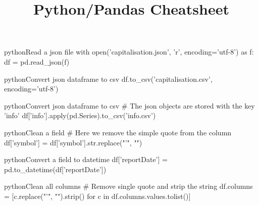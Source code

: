 \documentclass[10pt,a4paper]{article}
\title{\color{w3schools}Python/Pandas Cheatsheet
}
\begin{document}
\maketitle
\small
\begin{multicols}{3}

\thispagestyle{empty}
\scriptsize

% 




\begin{codebox}{python}{Read a json file}
with open('capitalisation.json', 'r', encoding='utf-8') as f:
     df = pd.read_json(f)

\end{codebox}

\begin{codebox}{python}{Convert json dataframe to csv}
df.to_csv('capitalisation.csv', encoding='utf-8')

\end{codebox}

\begin{codebox}{python}{Convert json dataframe to csv}
# The json objects are stored with the key 'info'
df['info'].apply(pd.Series).to_csv('info.csv')

\end{codebox}

\begin{codebox}{python}{Clean a field}
# Here we remove the simple quote from the column 
df['symbol'] = df['symbol'].str.replace("'", "")

\end{codebox}

\begin{codebox}{python}{Convert a field to datetime}
df['reportDate'] = pd.to_datetime(df['reportDate'])

\end{codebox}

\begin{codebox}{python}{Clean all columns}
# Remove single quote and strip the string
df.columns = [c.replace("'", "").strip() for c in df.columns.values.tolist()]

\end{codebox}


\AtNextBibliography{\footnotesize}
\printbibliography  
\end{multicols}
\end{document}
